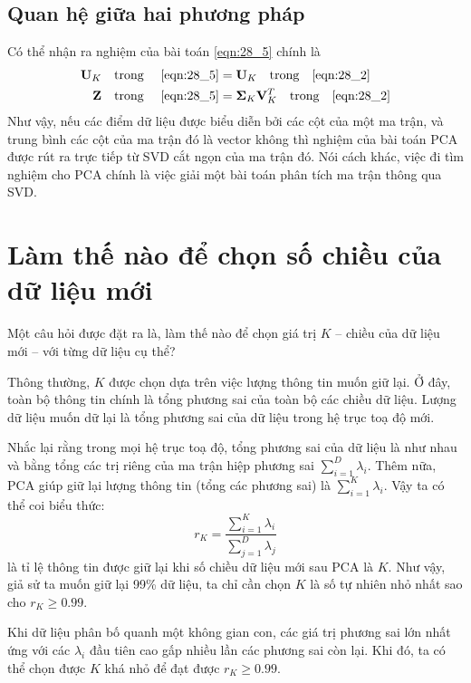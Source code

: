 \subsection{Quan hệ giữa hai phương pháp}
Có thể nhận ra nghiệm của bài toán \eqref{eqn:28_5} chính là
\begin{align*}
    \mathbf{U}_K \quad \text{trong}\quad~\eqref{eqn:28_5}     & = \mathbf{U}_K \quad\text{trong} \quad
    \eqref{eqn:28_2}                                                                                                                 \\\
    \mathbf{Z} \quad\text{trong}\quad~\eqref{eqn:28_5} & = \mathbf{\Sigma}_K \mathbf{V}_K^T \quad\text{trong} \quad \eqref{eqn:28_2}
\end{align*}
Như vậy, nếu các điểm dữ liệu được biểu diễn bởi các cột của một ma trận, và
trung bình các cột của ma trận đó là vector không thì nghiệm của bài toán PCA được rút ra trực tiếp từ SVD cắt ngọn của
ma trận đó. Nói cách khác, việc đi tìm nghiệm cho PCA chính là việc giải một
bài toán phân tích ma trận thông qua SVD.


\section{Làm thế nào để chọn số chiều của dữ liệu mới}

Một câu hỏi được đặt ra là, làm thế nào để chọn giá trị $K$  --  chiều của dữ
liệu mới  --  với từng dữ liệu cụ thể?

Thông thường, $K$ được chọn dựa trên việc {lượng thông tin muốn giữ lại}. Ở đây, toàn bộ thông tin chính là tổng phương sai của toàn bộ các chiều dữ liệu. Lượng dữ liệu muốn dữ lại là tổng phương sai của dữ liệu trong hệ trục toạ độ mới.

Nhắc lại rằng trong mọi hệ trục toạ độ, tổng phương sai của dữ liệu là như nhau
và bằng tổng các trị riêng của ma trận hiệp phương sai $\sum_{i=1}^D
    \lambda_i$. Thêm nữa, PCA giúp giữ lại lượng thông tin (tổng các phương sai) là
$\sum_{i=1}^K \lambda_i$. Vậy ta có thể coi biểu thức:
\begin{equation}
    \label{eqn:28_6}
    r_K = \frac{\sum_{i=1}^K \lambda_i}{\sum_{j=1}^D \lambda_j}
\end{equation}
là tỉ lệ thông tin được giữ lại khi số chiều dữ liệu mới sau PCA là $K$. Như
vậy, giả sử ta muốn giữ lại 99\% dữ liệu, ta chỉ cần chọn $K$ là số tự nhiên
nhỏ nhất sao cho $r_K \geq 0.99$.

Khi dữ liệu phân bố quanh một không gian con, các giá trị phương sai lớn nhất
ứng với các $\lambda_i$ đầu tiên cao gấp nhiều lần các phương sai còn lại.
Khi đó, ta có thể chọn được $K$ khá nhỏ để đạt được $r_K \geq 0.99$.


